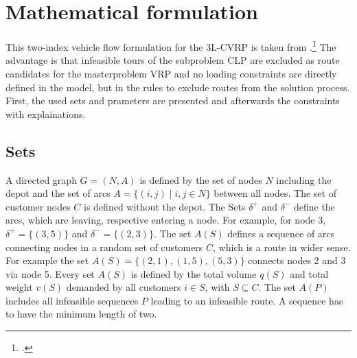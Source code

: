 \section{Mathematical formulation}
\label{sec:mathematical_formulation}

This two-index vehicle flow formulation for the \gls{3L-CVRP} is taken from \cite{tamke_branch-and-cut_2024}.\footcite[cf.][pp. 6-7]{tamke_branch-and-cut_2024}
The advantage is that infeasible tours of the subproblem \gls{CLP} are excluded
as route candidates for the masterproblem \gls{VRP} and no loading constraints are directly defined in the model, but in the rules
to exclude routes from the solution process. First, the used sets and prameters are presented and afterwards the constraints with
explainations.

\subsection*{Sets}
A directed graph $G=(N,A)$ is defined by the set of nodes $N$ including the depot and the set of arcs
$A = \{ (i, j) \mid i, j \in N \}$ between all nodes. The set of customer nodes $C$ is defined without the depot.
The Sets $\delta^+$ and $\delta^-$ define the arcs, which are leaving, respective entering a node.
For example, for node 3, $\delta^+ = \{(3,5)\}$ and $\delta^-= \{(2,3)\}$.
The set $A(S)$ defines a sequence of arcs connecting nodes in a random set of customers $C$,
which is a route in wider sense. For example the set $A(S)=\{(2,1),(1,5),(5,3)\}$ connects nodes
2 and 3 via node 5. Every set $A(S)$ is defined by the total volume $q(S)$ and total weight $v(S)$
demanded by all customers $i \in S$, with $S \subseteq C$. The set $A(P)$ includes all infeasible sequences $P$ leading
to an infeasible route. A sequence has to have the minimum length of two.

